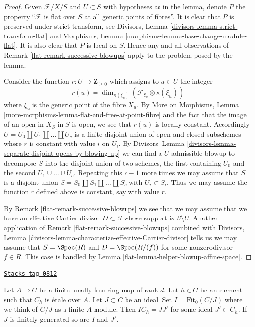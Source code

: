 \begin{proof}

Given $\mathcal{F}/X/S$ and $U \subset S$ with hypotheses as
in the lemma, denote $P$ the property ``$\mathcal{F}$ is flat over $S$ at
all generic points of fibres''. It is clear that $P$ is preserved under
strict transform, see
Divisors, Lemma \ref{divisors-lemma-strict-transform-flat}
and Morphisms, Lemma \ref{morphisms-lemma-base-change-module-flat}.
It is also clear that $P$ is local on $S$. Hence any and all observations
of Remark \ref{flat-remark-successive-blowups} apply to the problem posed by
the lemma.

\medskip\noindent
Consider the function $r : U \to \mathbf{Z}_{\geq 0}$ which assigns to
$u \in U$ the integer
$$
r(u) = \dim_{\kappa(\xi_u)}(\mathcal{F}_{\xi_u} \otimes \kappa(\xi_u))
$$
where $\xi_u$ is the generic point of the fibre $X_u$.
By More on Morphisms, Lemma
\ref{more-morphisms-lemma-flat-and-free-at-point-fibre}
and the fact that the image of an open in $X_S$ in $S$ is open,
we see that $r(u)$ is locally constant. Accordingly
$U = U_0 \amalg U_1 \amalg \ldots \amalg U_c$ is a finite disjoint
union of open and closed subschemes where $r$ is constant with value
$i$ on $U_i$. By
Divisors, Lemma \ref{divisors-lemma-separate-disjoint-opens-by-blowing-up}
we can find a $U$-admissible blowup to decompose $S$ into
the disjoint union of two schemes, the first containing $U_0$ and
the second $U_1 \cup \ldots \cup U_c$. Repeating this $c - 1$
more times we may assume that $S$ is a disjoint union
$S = S_0 \amalg S_1 \amalg \ldots \amalg S_c$ with $U_i \subset S_i$.
Thus we may assume the function $r$ defined above is constant, say
with value $r$.

\medskip\noindent
By Remark \ref{flat-remark-successive-blowups} we see that we may assume that
we have an effective Cartier divisor $D \subset S$ whose support is
$S \setminus U$. Another application of Remark \ref{flat-remark-successive-blowups}
combined with
Divisors, Lemma \ref{divisors-lemma-characterize-effective-Cartier-divisor}
tells us we may assume that
$S = \Spec(R)$ and $D = \Spec(R/(f))$ for some nonzerodivisor
$f \in R$. This case is handled by
Lemma \ref{flat-lemma-helper-blowup-affine-space}.
\end{proof}

\begin{lemma}
\label{flat-lemma-trick-fitting-ideal}
\href{https://stacks.math.columbia.edu/tag/0812}{\texttt{Stacks tag 0812}}

Let $A \to C$ be a finite locally free ring map of rank $d$.
Let $h \in C$ be an element such that $C_h$ is \'etale over $A$.
Let $J \subset C$ be an ideal. Set $I = \text{Fit}_0(C/J)$ where we
think of $C/J$ as a finite $A$-module. Then $IC_h = JJ'$ for some ideal
$J' \subset C_h$. If $J$ is finitely generated so are $I$ and $J'$.
\end{lemma}

